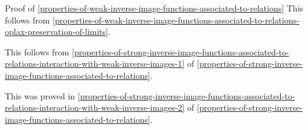 \begin{Proof}{Proof of \cref{properties-of-weak-inverse-image-functions-associated-to-relations}}
    This follows from \cref{properties-of-weak-inverse-image-functions-associated-to-relations-oplax-preservation-of-limits}.

    This follows from \cref{properties-of-strong-inverse-image-functions-associated-to-relations-interaction-with-weak-inverse-images-1} of \cref{properties-of-strong-inverse-image-functions-associated-to-relations}.

    This was proved in \cref{properties-of-strong-inverse-image-functions-associated-to-relations-interaction-with-weak-inverse-images-2} of \cref{properties-of-strong-inverse-image-functions-associated-to-relations}.
\end{Proof}
